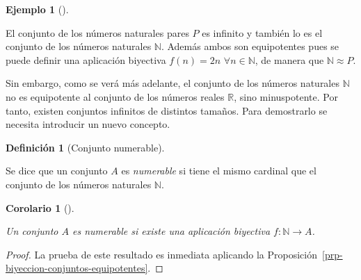 \documentclass[
  a4paper,
]{scrreport}
\theoremstyle{definition}
\newtheorem{example}{Ejemplo}[chapter]
\theoremstyle{plain}
\newtheorem{corollary}{Corolario}[chapter]
\theoremstyle{definition}
\newtheorem{definition}{Definición}[chapter]
\theoremstyle{definition}
\theoremstyle{plain}
\theoremstyle{plain}
\theoremstyle{remark}
\begin{document}
\begin{example}[]\protect\hypertarget{exm-conjunto-pares-equipotente-naturales}{}\label{exm-conjunto-pares-equipotente-naturales}

El conjunto de los números naturales pares \(P\) es infinito y también
lo es el conjunto de los números naturales \(\mathbb{N}\). Además ambos
son equipotentes pues se puede definir una aplicación biyectiva
\(f(n) = 2n\) \(\forall n\in\mathbb{N}\), de manera que
\(\mathbb{N}\approx P\).

\end{example}

Sin embargo, como se verá más adelante, el conjunto de los números
naturales \(\mathbb{N}\) no es equipotente al conjunto de los números
reales \(\mathbb{R}\), sino minuspotente. Por tanto, existen conjuntos
infinitos de distintos tamaños. Para demostrarlo se necesita introducir
un nuevo concepto.

\begin{definition}[Conjunto
numerable]\protect\hypertarget{def-conjuntos-numerables}{}\label{def-conjuntos-numerables}

Se dice que un conjunto \(A\) es \emph{numerable} si tiene el mismo
cardinal que el conjunto de los números naturales \(\mathbb{N}\).

\end{definition}

\begin{corollary}[]\protect\hypertarget{cor-biyeccion-conjunto-numerable}{}\label{cor-biyeccion-conjunto-numerable}

Un conjunto \(A\) es numerable si existe una aplicación biyectiva
\(f:\mathbb{N}\rightarrow A\).

\end{corollary}

\begin{tcolorbox}[enhanced jigsaw, leftrule=.75mm, colbacktitle=quarto-callout-note-color!10!white, toprule=.15mm, opacityback=0, opacitybacktitle=0.6, toptitle=1mm, breakable, bottomtitle=1mm, colframe=quarto-callout-note-color-frame, rightrule=.15mm, titlerule=0mm, title=\textcolor{quarto-callout-note-color}{\faInfo}\hspace{0.5em}{Demostración}, arc=.35mm, left=2mm, bottomrule=.15mm, colback=white, coltitle=black]

\begin{proof}
La prueba de este resultado es inmediata aplicando la
Proposición~\ref{prp-biyeccion-conjuntos-equipotentes}.
\end{proof}

\end{tcolorbox}
\end{document}
